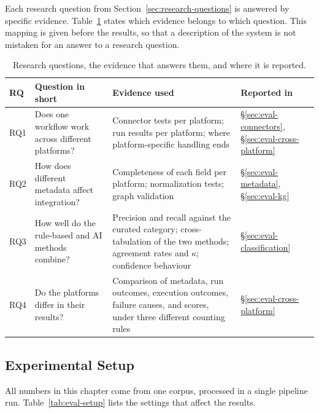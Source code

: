 Each research question from Section~\ref{sec:research-questions} is answered by specific evidence. Table~\ref{tab:rq-evidence} states which evidence belongs to which question. This mapping is given before the results, so that a description of the system is not mistaken for an answer to a research question.

\begin{table}[htbp]
\centering
\caption{Research questions, the evidence that answers them, and where it is reported.}
\label{tab:rq-evidence}
\small
\begin{tabularx}{\textwidth}{@{}>{\raggedright\arraybackslash}p{0.9cm}>{\raggedright\arraybackslash}p{4.3cm}>{\raggedright\arraybackslash}X>{\raggedright\arraybackslash}p{2.0cm}@{}}
\toprule
RQ & Question in short & Evidence used & Reported in\tabularnewline
\midrule
RQ1 & Does one workflow work across different platforms? & Connector tests per platform; run results per platform; where platform-specific handling ends & \S\ref{sec:eval-connectors}, \S\ref{sec:eval-cross-platform}\tabularnewline
RQ2 & How does different metadata affect integration? & Completeness of each field per platform; normalization tests; graph validation & \S\ref{sec:eval-metadata}, \S\ref{sec:eval-kg}\tabularnewline
RQ3 & How well do the rule-based and AI methods combine? & Precision and recall against the curated category; cross-tabulation of the two methods; agreement rates and $\kappa$; confidence behaviour & \S\ref{sec:eval-classification}\tabularnewline
RQ4 & Do the platforms differ in their results? & Comparison of metadata, run outcomes, execution outcomes, failure causes, and scores, under three different counting rules & \S\ref{sec:eval-cross-platform}\tabularnewline
\bottomrule
\end{tabularx}
\end{table}

\subsection{Experimental Setup}

All numbers in this chapter come from one corpus, processed in a single pipeline run. Table~\ref{tab:eval-setup} lists the settings that affect the results.

